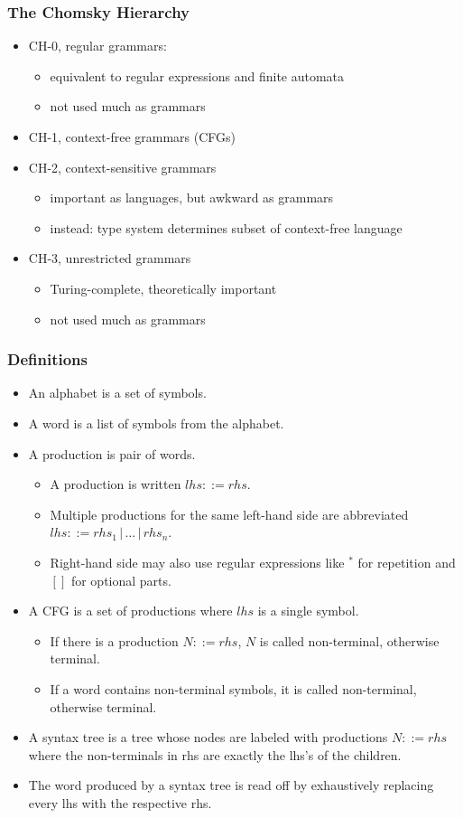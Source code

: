 \begin{frame}\frametitle{The Chomsky Hierarchy}
\begin{itemize}
\item CH-0, regular grammars: 
 \begin{itemize}
  \item equivalent to regular expressions and finite automata
  \item not used much as grammars
 \end{itemize}
\item CH-1, context-free grammars (CFGs) 
\item CH-2, context-sensitive grammars
 \begin{itemize}
   \item important as languages, but awkward as grammars
   \item instead: type system determines subset of context-free language
 \end{itemize}
\item CH-3, unrestricted grammars
 \begin{itemize}
   \item Turing-complete, theoretically important
   \item not used much as grammars
 \end{itemize}
\end{itemize}
\end{frame}

\begin{frame}\frametitle{Definitions}
\begin{itemize}
\item An alphabet is a set of symbols.
\item A word is a list of symbols from the alphabet.
\item A production is pair of words.
 \begin{itemize}
 \item A production is written $lhs::=rhs$.
 \item Multiple productions for the same left-hand side are abbreviated $lhs::=rhs_1 \,|\,\ldots\,|\, rhs_n$.
 \item Right-hand side may also use regular expressions like $^*$ for repetition and $[]$ for optional parts.
 \end{itemize}
\item A CFG is a set of productions where $lhs$ is a single symbol.
 \begin{itemize}
 \item If there is a production $N::=rhs$, $N$ is called non-terminal, otherwise terminal.
 \item If a word contains non-terminal symbols, it is called non-terminal, otherwise terminal.
 \end{itemize}
\item A syntax tree is a tree whose nodes are labeled with productions $N::=rhs$ where the non-terminals in rhs are exactly the lhs's of the children.
\item The word produced by a syntax tree is read off by exhaustively replacing every lhs with the respective rhs.
\end{itemize}
\end{frame}

